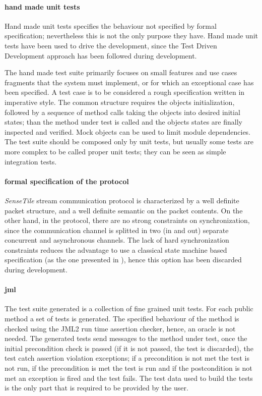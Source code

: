 \documentclass[english]{lni}
\newcommand{\ST}{\emph{SenseTile}\xspace}
\begin{document}
\paragraph*{hand made unit tests}

Hand made unit tests specifies the behaviour not specified by formal specification; nevertheless this is not the only purpose they have.
Hand made unit tests have been used to drive the development, since the Test Driven Development approach\cite{Beck2003} has been
followed during development.

The hand made test suite primarily focuses on small features and use cases fragments that the system must implement, or for which an exceptional case has been specified. 
A test case is to be considered a rough specification written in imperative style. 
The common structure requires the objects initialization, followed by a sequence of method calls taking the objects into desired initial states; than the method under test is called and the objects states are finally inspected and verified. 
Mock objects can be used to limit module dependencies. 
The test suite should be composed only by unit tests, but usually some tests are more complex to be called proper unit tests; they can be seen as simple integration tests.


\paragraph{formal specification of the protocol}

\ST stream communication protocol is characterized by a well definite packet structure, and a well definite semantic on the packet contents.  
On the other hand, in the protocol, there are no strong constraints on synchronization, since the communication channel is splitted in two (in and out) separate concurrent and asynchronous channels.
The lack of hard synchronization constraints reduces the advantage to use a classical state machine based specification (as the one presented in \cite{Hubbers2004}), hence this option has been discarded during development.

\paragraph{jml}

The test suite generated is a collection of fine grained unit tests.
For each public method a set of tests is generated.
The specified behaviour of the method is checked using the JML2 run time assertion checker, hence, an oracle is not needed.  
The generated tests send messages to the method under test, once the initial precondition check is passed (if it is not passed, the test is discarded), the test catch assertion violation exceptions; if a precondition is not met the test is not run, if the precondition is met the test is run and if the postcondition is not met an exception is fired and the test fails.
The test data used to build the tests is the only part that is required to be provided by the user.
\end{document}

